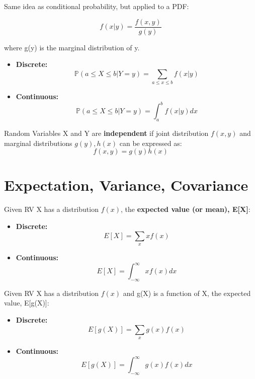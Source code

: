\documentclass[10pt, letterpaper, twoside]{article}
\begin{document}
\begin{multicols}{2}
Same idea as conditional probability, but applied to a PDF:

\begin{equation*}
    f(x|y) = \frac{f(x,y)}{g(y)}
\end{equation*}

where g(y) is the marginal distribution of y.
\begin{itemize}
    \item \textbf{Discrete:} 
    \begin{equation*}
        \mathbb{P}(a \leq X \leq b|Y=y) = \sum_{a\leq x\leq b}f(x|y)
    \end{equation*}
    \item \textbf{Continuous:}
    \begin{equation*}
        \mathbb{P}(a \leq X \leq b|Y = y) = \int_a^b f(x|y)dx
    \end{equation*}
\end{itemize}

Random Variables X and Y are \textbf{independent} if joint distribution $f(x,y)$ and marginal distributions $g(y), h(x)$ can be expressed as:
\begin{equation*}
    f(x,y) = g(y)h(x)
\end{equation*}
\vfill\pagebreak

\section{Expectation, Variance, Covariance}

Given RV X has a distribution $f(x)$, the \textbf{expected value (or mean), E[X]}:
\begin{itemize}
    \item \textbf{Discrete:}
    \begin{equation*}
        E[X] = \sum_xxf(x)
    \end{equation*}
    \item\textbf{Continuous:}
    \begin{equation*}
        E[X] = \int_{-\infty}^{\infty}xf(x)dx
    \end{equation*}
\end{itemize}

Given RV X has a distribution $f(x)$ and g(X) is a function of X, the expected value, E[g(X)]:
\begin{itemize}
    \item \textbf{Discrete:}
    \begin{equation*}
        E[g(X)] = \sum_xg(x)f(x)
    \end{equation*}
    \item\textbf{Continuous:}
    \begin{equation*}
        E[g(X)] = \int_{-\infty}^{\infty}g(x)f(x)dx
    \end{equation*}
\end{itemize}


\end{multicols}
\end{document}
